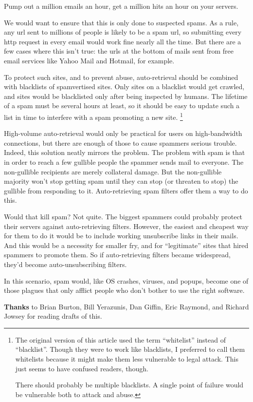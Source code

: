 Pump out a million emails an hour, get a million hits an hour on your
servers.

We would want to ensure that this is only done to suspected spams. As a
rule, any url sent to millions of people is likely to be a spam url, so
submitting every http request in every email would work fine nearly all
the time. But there are a few cases where this isn't true: the urls at
the bottom of mails sent from free email services like Yahoo Mail and
Hotmail, for example.

To protect such sites, and to prevent abuse, auto-retrieval should be
combined with blacklists of spamvertised sites. Only sites on a
blacklist would get crawled, and sites would be blacklisted only after
being inspected by humans. The lifetime of a spam must be several hours
at least, so it should be easy to update such a list in time to
interfere with a spam promoting a new site. \footnote{The original version of this article used the term ``whitelist''
instead of ``blacklist''. Though they were to work like blacklists, I
preferred to call them whitelists because it might make them less
vulnerable to legal attack. This just seems to have confused readers,
though.

There should probably be multiple blacklists. A single point of failure
would be vulnerable both to attack and abuse.}

High-volume auto-retrieval would only be practical for users on
high-bandwidth connections, but there are enough of those to cause
spammers serious trouble. Indeed, this solution neatly mirrors the
problem. The problem with spam is that in order to reach a few gullible
people the spammer sends mail to everyone. The non-gullible recipients
are merely collateral damage. But the non-gullible majority won't stop
getting spam until they can stop (or threaten to stop) the gullible from
responding to it. Auto-retrieving spam filters offer them a way to do
this.

Would that kill spam? Not quite. The biggest spammers could probably
protect their servers against auto-retrieving filters. However, the
easiest and cheapest way for them to do it would be to include working
unsubscribe links in their mails. And this would be a necessity for
smaller fry, and for ``legitimate'' sites that hired spammers to promote
them. So if auto-retrieving filters became widespread, they'd become
auto-unsubscribing filters.

In this scenario, spam would, like OS crashes, viruses, and popups,
become one of those plagues that only afflict people who don't bother to
use the right software.


\textbf{Thanks} to Brian Burton, Bill Yerazunis, Dan Giffin, Eric
Raymond, and Richard Jowsey for reading drafts of this.
